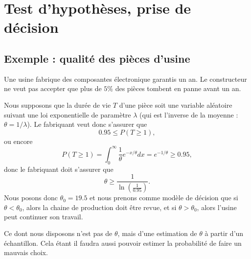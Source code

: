 \section{Test d'hypothèses, prise de décision}

\subsection{Exemple : qualité des pièces d'usine}

Une usine fabrique des composantes électronique garantis un an. Le constructeur ne veut pas accepter que plus de \( 5\%\) des pièces tombent en panne avant un an.

Nous supposons que la durée de vie \( T\) d'une pièce soit une variable aléatoire suivant une loi exponentielle de paramètre \( \lambda\) (qui est l'inverse de la moyenne : \( \theta=1/\lambda\)). Le fabriquant veut donc s'assurer que
\begin{equation}
	0.95\leq P(T\geq 1),
\end{equation}
ou encore
\begin{equation}
	P(T\geq 1)=\int_0^{\infty}\frac{1}{ \theta } e^{-x/\theta}dx= e^{-1/\theta}\geq 0.95,
\end{equation}
donc le fabriquant doit s'assurer que
\begin{equation}
	\theta\geq\frac{1}{ \ln\left( \frac{1}{ 0.95 } \right) }.
\end{equation}
Nous posons donc \( \theta_0=19.5\) et nous prenons comme modèle de décision que si \( \theta<\theta_0\), alors la chaine de production doit être revue, et si \( \theta>\theta_0\), alors l'usine peut continuer son travail.

Ce dont nous disposons n'est pas de \( \theta\), mais d'une estimation de \( \theta\) à partir d'un échantillon. Cela étant il faudra aussi pouvoir estimer la probabilité de faire un mauvais choix.

